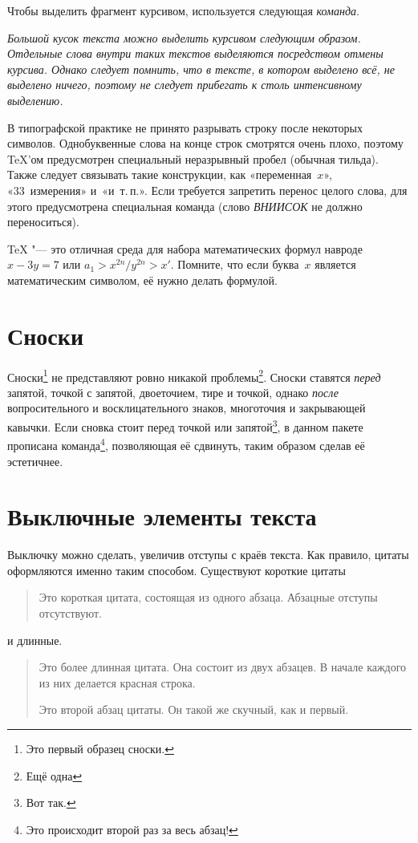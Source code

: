\documentclass[final,pdftex]{epsilonj}
\numberwithin{equation}{section}
\begin{document}
Чтобы выделить фрагмент курсивом, используется следующая \textit{команда}.


\emph{Большой кусок текста можно выделить курсивом следующим образом. Отдельные слова внутри таких текстов выделяются посредством \emph{отмены курсива}. Однако следует помнить, что в тексте, в котором выделено всё, не выделено ничего, поэтому не следует прибегать к столь интенсивному выделению.}

В типографской практике не принято разрывать строку после некоторых символов. Однобуквенные слова на конце строк смотрятся очень плохо, поэтому \TeX'ом предусмотрен специальный неразрывный пробел (обычная тильда). Также следует связывать такие конструкции, как «переменная~$x$», «33~измерения» и~«и~т.\,п.». Если требуется запретить перенос целого слова, для этого предусмотрена специальная команда (слово \mbox{\emph{ВНИИСОК}} не должно переноситься).

\TeX{} "--- это отличная среда для набора математических формул навроде 
       $ x-3y = 7 $
или
       $ a_{1} > x^{2n} / y^{2n} > x' $.
Помните, что если буква~$x$ является математическим символом, её нужно делать формулой.

\section{Сноски}
Сноски\footnote{Это первый образец сноски.}
не представляют ровно никакой проблемы\footnote{Ещё одна}\fnnsp. Сноски ставятся \emph{перед} запятой, точкой с запятой, двоеточием, тире и точкой, однако \emph{после} вопросительного и восклицательного знаков, многоточия и закрывающей кавычки. Если сновка стоит перед точкой или запятой\footnote{Вот так.}, в данном пакете прописана команда\footnote{Это происходит второй раз за весь абзац!}\fnnsp, позволяющая её сдвинуть, таким образом сделав её эстетичнее.

\section{Выключные элементы текста}

Выключку можно сделать, увеличив отступы с краёв текста. Как правило, цитаты оформляются именно таким способом.
Существуют короткие цитаты 
\begin{quote}
   Это короткая цитата, состоящая из одного абзаца. Абзацные отступы отсутствуют. 
\end{quote}
и длинные.
\begin{quotation}
   Это более длинная цитата. Она состоит из двух абзацев. В начале каждого из них делается красная строка.

   Это второй абзац цитаты. Он такой же скучный, как и первый.
\end{quotation}
\end{document}
